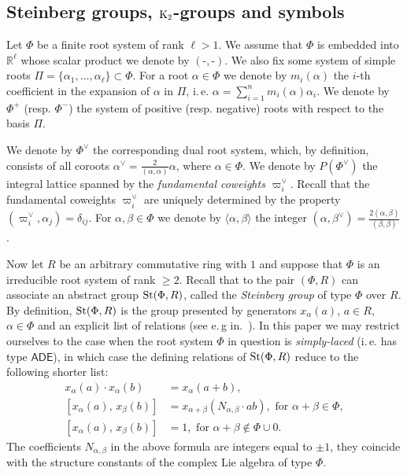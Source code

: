 \subsection{Steinberg groups, $\operatorname{K}_2$-groups and symbols}\label{subsec:steinberg-preliminaries}
Let $\Phi$ be a finite root system of rank $\ell > 1$.
We assume that $\Phi$ is embedded into $\mathbb{R}^\ell$ whose scalar product we denote by $(\text{-}, \text{-})$.
We also fix some system of simple roots $\Pi = \{\alpha_1, \ldots, \alpha_\ell\} \subset \Phi$.
For a root $\alpha\in\Phi$ we denote by $m_i(\alpha)$ the $i$-th coefficient in the expansion of $\alpha$ in $\Pi$,
i.\,e. $\alpha = \sum_{i=1}^n m_i(\alpha) \alpha_i$.
We denote by $\Phi^+$ (resp. $\Phi^-$) the system of positive (resp. negative) roots with respect to the basis $\Pi$.

We denote by $\Phi^\vee$ the corresponding dual root system, which, by definition, consists of all coroots $\alpha^\vee = \frac{2}{(\alpha, \alpha)} \alpha$, where $\alpha \in \Phi$.
We denote by $P(\Phi^\vee)$ the integral lattice spanned by the \emph{fundamental coweights $\varpi_i^\vee$}.
Recall that the fundamental coweights $\varpi_i^\vee$ are uniquely determined by the property $(\varpi_i^\vee, \alpha_j) = \delta_{ij}$.
For $\alpha,\beta \in \Phi$ we denote by $\langle \alpha, \beta \rangle$ the integer $(\alpha, \beta^\vee) = \frac{2(\alpha, \beta)}{(\beta, \beta)}$.

Now let $R$ be an arbitrary commutative ring with $1$ and suppose that $\Phi$ is an irreducible root system of rank $\geq 2$.
Recall that to the pair $(\Phi, R)$ can associate an abstract group $\operatorname{St}(\Phi, R)$, called the \textit{Steinberg group} of type $\Phi$ over $R$.
By definition, $\operatorname{St}(\Phi, R)$ is the group presented by generators $x_\alpha(a)$, $a \in R$, $\alpha \in \Phi$ and an explicit list of relations (see e.\,g in.~\cite{Ma69, Re75, St71}).
In this paper we may restrict ourselves to the case when the root system $\Phi$ in question is \textit{simply-laced} (i.\,e. has type $\mathsf{ADE}$),
 in which case the defining relations of $\operatorname{St}(\Phi, R)$ reduce to the following shorter list:
\begin{align}
x_{\alpha}(a)\cdot x_{\alpha}(b)&=x_{\alpha}(a+b), \tag{R1} \label{x-additivity}\\
[x_{\alpha}(a),\,x_{\beta}(b)]  &=x_{\alpha+\beta}(N_{\alpha,\beta} \cdot ab),\text{ for }\alpha+\beta\in\Phi, \tag{R2} \label{R2} \\
[x_{\alpha}(a),\,x_{\beta}(b)]  &=1,\text{ for }\alpha+\beta\not\in\Phi\cup0. \tag{R3} \label{R3}
\end{align}
The coefficients $N_{\alpha,\beta}$ in the above formula are integers equal to $\pm 1$, they coincide with the structure constants of the complex Lie algebra of type $\Phi$.

